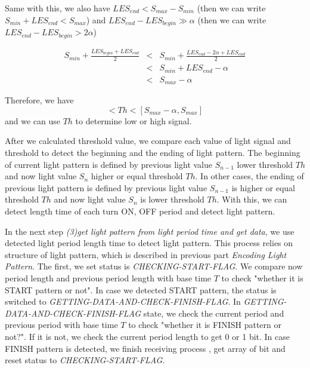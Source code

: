 Same with this, we also have $LES_{end}  <  S_{max} - S_{min}$ (then we can write  $S_{min} + LES_{end} <  S_{max}$) and $LES_{end} - LES_{begin} \gg \alpha$  (then we can write $LES_{end} - LES_{begin}  > 2\alpha$)

\begin{equation}
\begin{array}{lcl}
   S_{min} + \frac{LES_{begin}+LES_{end}}{2} & < &  S_{min} +  \frac{LES_{end} - 2\alpha +LES_{end}}{2} \\
     & <  & S_{min} + LES_{end} - \alpha \\
     & <  & S_{max} - \alpha
\end{array} 
\end{equation}

Therefore, we have 
\begin{equation}
    [S_{min}, S_{min} + \alpha]< Th < [S_{max} - \alpha, S_{max}]
\end{equation}
and we can use $Th$ to determine low or high signal.

After we calculated threshold value, we compare each value of light signal and threshold to detect the beginning and the ending of light pattern. The beginning of current light pattern is defined by previous light value $S_{n-1}$ lower threshold $Th$ and now light value $S_n$ higher or equal threshold $Th$. In other cases, the ending of previous light pattern is defined by previous light value $S_{n-1}$ is higher or equal threshold $Th$ and now light value $S_n$ is lower threshold $Th$. With this, we can detect length time of each turn ON, OFF period and detect light pattern.

In the next step \emph{(3)get light pattern from light period time and get data}, we use detected light period length time to detect light pattern. This process relies on structure of light pattern, which is described in previous part \emph{Encoding Light Pattern}. The first, we set status is \emph{CHECKING-START-FLAG}. We compare now period length and previous period length with base time $T$ to check "whether it is START pattern or not". In case we detected START pattern, the status is switched to \emph{GETTING-DATA-AND-CHECK-FINISH-FLAG}. In \emph{GETTING-DATA-AND-CHECK-FINISH-FLAG} state, we check the current period and previous period with base time $T$ to check "whether it is FINISH pattern or not?". If it is not, we check the current period length to get 0 or 1 bit. In case FINISH pattern is detected, we finish receiving process , get array of bit and reset status to \emph{CHECKING-START-FLAG}.

